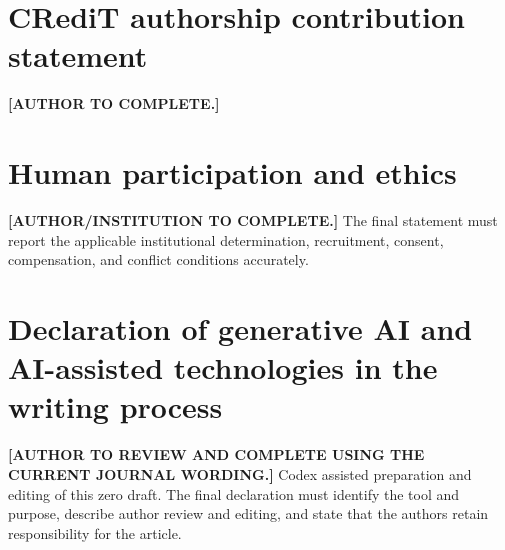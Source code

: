 \documentclass[preprint,review,12pt,authoryear]{elsarticle}
\begin{document}
\section*{CRediT authorship contribution statement}

\textbf{[AUTHOR TO COMPLETE.]}

\section*{Human participation and ethics}

\textbf{[AUTHOR/INSTITUTION TO COMPLETE.]}
The final statement must report the applicable institutional determination,
recruitment, consent, compensation, and conflict conditions accurately.

\section*{Declaration of generative AI and AI-assisted technologies in the writing process}

\textbf{[AUTHOR TO REVIEW AND COMPLETE USING THE CURRENT JOURNAL WORDING.]}
Codex assisted preparation and editing of this zero draft. The final declaration
must identify the tool and purpose, describe author review and editing, and
state that the authors retain responsibility for the article.



\end{document}
